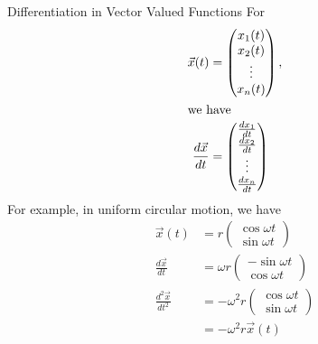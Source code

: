 \documentclass[8pt]{extarticle}
\begin{document}
  \begin{problem}{Differentiation in Vector Valued Functions}
    For
    \begin{align*}
      \vec{x}(t) &= \begin{pmatrix}x_1(t) \\ x_2(t) \\ \vdots \\ x_n(t)\end{pmatrix},\\
      \shortintertext{we have}
      \frac{d\vec{x}}{dt} &= \begin{pmatrix}\frac{dx_1}{dt} \\ \frac{dx_2}{dt}\\\vdots\\\frac{dx_n}{dt}\end{pmatrix}
    \end{align*}
    For example, in uniform circular motion, we have
    \begin{align*}
      \vec{x}(t) &= r\begin{pmatrix}\cos\omega t \\ \sin\omega t\end{pmatrix}\\
      \frac{d\vec{x}}{dt} &= \omega r \begin{pmatrix}-\sin\omega t \\ \cos\omega t\end{pmatrix}\\
      \frac{d^2\vec{x}}{dt^2} &= -\omega^2r \begin{pmatrix}\cos\omega t \\ \sin\omega t\end{pmatrix}\\
                              &= -\omega^2r \vec{x}(t)
    \end{align*}
  \end{problem}
\end{document}
